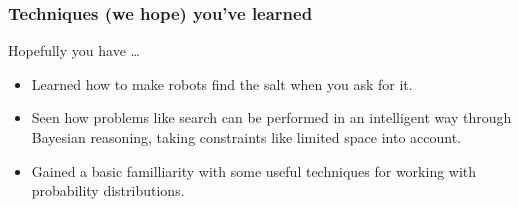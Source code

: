 \begin{frame}
  \frametitle{Techniques (we hope) you've learned}
  Hopefully you have \ldots
  \begin{itemize}
    \item Learned how to make robots find the salt when you ask for it.
    \item Seen how problems like search can be performed in an
          intelligent way through Bayesian reasoning,
          taking constraints like limited space into account.
    \item Gained a basic familliarity with some useful techniques for working with probability distributions.
  \end{itemize}
\end{frame}

\begin{frame}
\nocite{*}


\end{frame}
